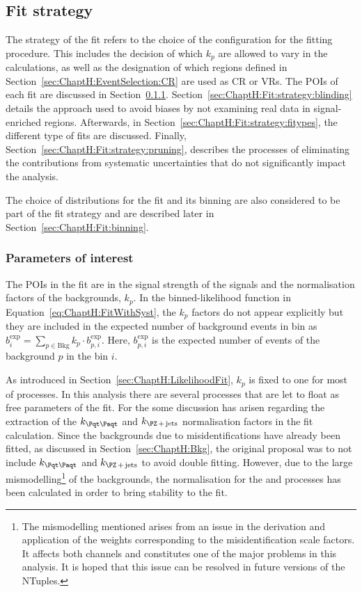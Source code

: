 \subsection{Fit strategy}
\label{sec:ChaptH:Fit:strategy}
The strategy of the fit refers to the choice of the configuration for the fitting procedure.
This includes the decision of  which $k_{p}$ are allowed to vary in the calculations, as well
as the designation of which regions defined in Section~\ref{sec:ChaptH:EventSelection:CR} 
are used as CR or VRs. 
The POIs of each fit are discussed in Section~\ref{sec:ChaptH:Fit:strategy:POIs}.
Section~\ref{sec:ChaptH:Fit:strategy:blinding} details the approach used to avoid biases 
by not examining real data in signal-enriched regions.
Afterwards, in Section~\ref{sec:ChaptH:Fit:strategy:fitypes}, the different type of fits
are discussed.
Finally, Section~\ref{sec:ChaptH:Fit:strategy:pruning}, describes the processes
of eliminating the contributions from systematic uncertainties that do not significantly impact the analysis.

The choice of distributions for the 
fit and its binning are also considered to be part of the fit strategy and are described
later in Section~\ref{sec:ChaptH:Fit:binning}.


\subsubsection{Parameters of interest}
\label{sec:ChaptH:Fit:strategy:POIs}
The POIs in the fit are in the signal strength of the \tHq signals and the normalisation factors of the backgrounds, $k_p$.
In the binned-likelihood function in Equation~\ref{eq:ChaptH:FitWithSyst}, the $k_p$ factors
do not appear explicitly but they are included in the expected number of background events in bin 
as $b_{i}^{\text{exp}} =  \sum_{p \in \text{Bkg}} k_{p} \cdot b_{p, i}^{\text{exp}}$. 
Here, $b_{p, i}^{\text{exp}}$ is the expected number of events of the background $p$ in the bin $i$.

As introduced in Section~\ref{sec:ChaptH:LikelihoodFit}, $k_p$ is fixed to one for most of processes.
In this analysis there are several processes that are let to float as free parameters of the fit.
For the \dilepOStau some discussion has arisen regarding the extraction of the 
$k_{\ttbar}$ and $k_{\Zjets}$ normalisation factors in the fit calculation.
Since the backgrounds due to misidentifications have already been fitted, as discussed 
in Section~\ref{sec:ChaptH:Bkg}, the original proposal was to not include $k_{\ttbar}$ and $k_{\Zjets}$ to 
avoid double fitting. However, due to the large mismodelling\footnote{The mismodelling mentioned arises from an 
issue in the derivation and application of the weights corresponding to the misidentification scale factors. It affects both \dileptau channels and 
constitutes one of the major problems in this analysis. It is hoped that this issue can be resolved in future versions 
of the NTuples.} of the backgrounds, the normalisation for the \ttbar and \Zjets  processes has been calculated in 
order to bring stability to the fit.  

